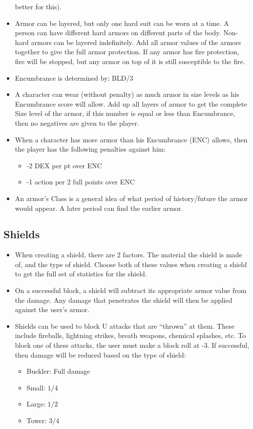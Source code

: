 \begin{itemize}
  better for this).
\item Armor can be layered, but only one hard suit can be worn at a 
  time.  A person can have different hard armors on different parts of 
  the body.  Non-hard armors can be layered indefinitely.  Add all 
  armor values of the armors together to give the full armor protection.  
  If any armor has fire protection, fire will be stopped, but any armor 
  on top of it is still susceptible to the fire.
\item Encumbrance is determined by: BLD/3
\item A character can wear (without penalty) as much armor in size 
  levels as his Encumbrance score will allow.  Add up all layers of 
  armor to get the complete Size level of the armor, if this number 
  is equal or less than Encumbrance, then no negatives are given to the player.
\item When a character has more armor than his Encumbrance (ENC) 
  allows, then the player has the following penalties against him:
  \begin{itemize}
  \item -2 DEX per pt over ENC
  \item -1 action per 2 full points over ENC
  \end{itemize}
\item An armor's Class is a general idea of what period of history/future 
  the armor would appear.  A later period can find the earlier armor.
\end{itemize}

\subsection{Shields}

\begin{itemize}
\item When creating a shield, there are 2 factors.  The material the 
  shield is made of, and the type of shield.  Choose both of these 
  values when creating a shield to get the full set of statistics 
  for the shield.
\item On a successful block, a shield will subtract its appropriate 
  armor value from the damage.  Any damage that penetrates the shield 
  will then be applied against the user's armor.
\item Shields can be used to block U attacks that are ``thrown'' 
  at them.  These include fireballs, lightning strikes, breath 
  weapons, chemical splashes, etc.  To block one of these attacks, 
  the user must make a block roll at -3.  If successful, then damage 
  will be reduced based on the type of shield:
  \begin{itemize}
  \item Buckler: Full damage
  \item Small: $1/4$
  \item Large: $1/2$
  \item Tower: $3/4$
  \end{itemize}
\end{itemize}